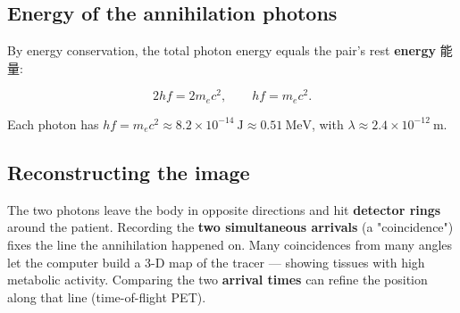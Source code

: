 \documentclass[11pt]{article}
\begin{document}
\subsection*{Energy of the annihilation photons}

By energy conservation, the total photon energy equals the pair's rest \textbf{energy} 能量:

\[
2 h f = 2 m_{e} c^{2}, \qquad h f = m_{e} c^{2}.
\]

Each photon has $h f = m_{e} c^{2} \approx 8.2 \times 10^{-14}\ \text{J} \approx 0.51\ \text{MeV}$, with $\lambda \approx 2.4 \times 10^{-12}\ \text{m}$.

\subsection*{Reconstructing the image}

The two photons leave the body in opposite directions and hit \textbf{detector rings} around the patient. Recording the \textbf{two simultaneous arrivals} (a "coincidence") fixes the line the annihilation happened on. Many coincidences from many angles let the computer build a 3-D map of the tracer — showing tissues with high metabolic activity. Comparing the two \textbf{arrival times} can refine the position along that line (time-of-flight PET).
\end{document}
